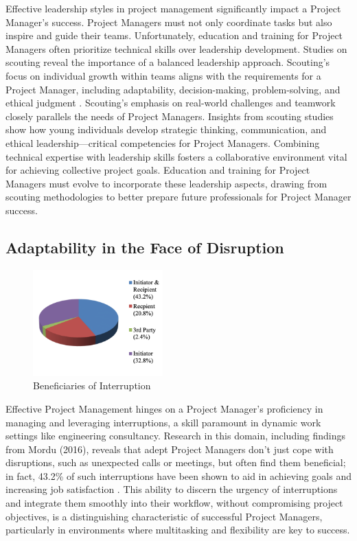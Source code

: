 \documentclass{article}
\begin{document}
Effective leadership styles in project management significantly impact a Project Manager's success. Project Managers must not only coordinate tasks but also inspire and guide their teams. Unfortunately, education and training for Project Managers often prioritize technical skills over leadership development. Studies on scouting reveal the importance of a balanced leadership approach. Scouting's focus on individual growth within teams aligns with the requirements for a Project Manager, including adaptability, decision-making, problem-solving, and ethical judgment \cite{kaluzny2022scouting}. Scouting's emphasis on real-world challenges and teamwork closely parallels the needs of Project Managers. Insights from scouting studies show how young individuals develop strategic thinking, communication, and ethical leadership—critical competencies for Project Managers. Combining technical expertise with leadership skills fosters a collaborative environment vital for achieving collective project goals. Education and training for Project Managers must evolve to incorporate these leadership aspects, drawing from scouting methodologies to better prepare future professionals for Project Manager success.

\subsection{Adaptability in the Face of Disruption}

\begin{figure}[htp]
    \centering
    \includegraphics[width=5cm]{Beneficiaries of Interruption.png}
    \caption{Beneficiaries of Interruption \cite{mordu2016managing}}
    \label{fig:Beneficiaries of Interruption}
\end{figure}

Effective Project Management hinges on a Project Manager's proficiency in managing and leveraging interruptions, a skill paramount in dynamic work settings like engineering consultancy. Research in this domain, including findings from Mordu (2016), reveals that adept Project Managers don't just cope with disruptions, such as unexpected calls or meetings, but often find them beneficial; in fact, 43.2\% of such interruptions have been shown to aid in achieving goals and increasing job satisfaction \cite{mordu2016managing}. This ability to discern the urgency of interruptions and integrate them smoothly into their workflow, without compromising project objectives, is a distinguishing characteristic of successful Project Managers, particularly in environments where multitasking and flexibility are key to success.
\end{document}
